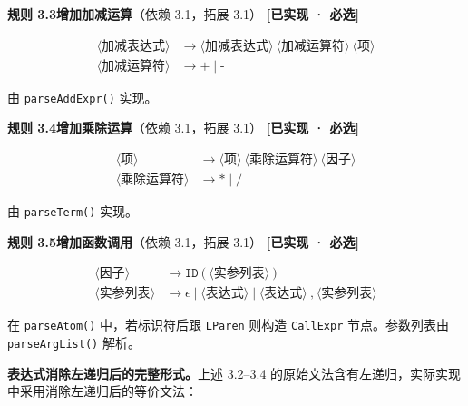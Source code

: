 \documentclass[12pt,a4paper]{ctexart}
\begin{document}
\textbf{规则 3.3\quad 增加加减运算}（依赖 3.1，拓展 3.1） \hfill \textcolor{green!60!black}{\textbf{[已实现 · 必选]}}

\begin{align}
\langle\text{加减表达式}\rangle &\rightarrow \langle\text{加减表达式}\rangle \ \langle\text{加减运算符}\rangle \ \langle\text{项}\rangle \\
\langle\text{加减运算符}\rangle &\rightarrow \texttt{+} \mid \texttt{-}
\end{align}

由 \texttt{parseAddExpr()} 实现。

\textbf{规则 3.4\quad 增加乘除运算}（依赖 3.1，拓展 3.1） \hfill \textcolor{green!60!black}{\textbf{[已实现 · 必选]}}

\begin{align}
\langle\text{项}\rangle &\rightarrow \langle\text{项}\rangle \ \langle\text{乘除运算符}\rangle \ \langle\text{因子}\rangle \\
\langle\text{乘除运算符}\rangle &\rightarrow \texttt{*} \mid \texttt{/}
\end{align}

由 \texttt{parseTerm()} 实现。

\textbf{规则 3.5\quad 增加函数调用}（依赖 3.1，拓展 3.1） \hfill \textcolor{green!60!black}{\textbf{[已实现 · 必选]}}

\begin{align}
\langle\text{因子}\rangle &\rightarrow \texttt{ID} \ \texttt{(} \ \langle\text{实参列表}\rangle \ \texttt{)} \\
\langle\text{实参列表}\rangle &\rightarrow \epsilon \mid \langle\text{表达式}\rangle \mid \langle\text{表达式}\rangle \ \texttt{,} \ \langle\text{实参列表}\rangle
\end{align}

在 \texttt{parseAtom()} 中，若标识符后跟 \texttt{LParen} 则构造 \texttt{CallExpr} 节点。参数列表由 \texttt{parseArgList()} 解析。

\textbf{表达式消除左递归后的完整形式。}上述 3.2--3.4 的原始文法含有左递归，实际实现中采用消除左递归后的等价文法：
\end{document}
